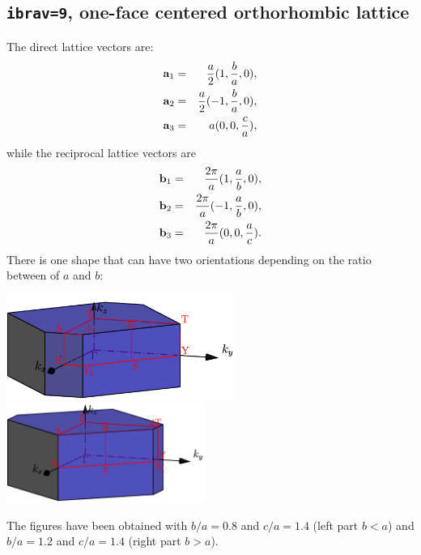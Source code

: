 \documentclass[12pt,a4paper]{article}
\begin{document}
\subsection{\texttt{ibrav=9}, one-face centered orthorhombic lattice}
The direct lattice vectors are:
\begin{eqnarray}
{\bf a}_1 &=& {a \over 2} (1, {b \over a}, 0), \nonumber \\
{\bf a}_2 &=& {a \over 2} (-1, {b \over a}, 0), \nonumber \\
{\bf a}_3 &=& a  (0, 0, {c \over a}), \nonumber
\nonumber
\end{eqnarray}
while the reciprocal lattice vectors are
\begin{eqnarray}
{\bf b}_1 &=& {2\pi \over a} (1, {a \over b}, 0), \nonumber \\
{\bf b}_2 &=& {2\pi \over a} (-1, {a \over b}, 0), \nonumber \\
{\bf b}_3 &=& {2\pi \over a} (0, 0, {a \over c}). \nonumber
\nonumber
\end{eqnarray}
There is one shape that can have two orientations depending on the
ratio between of $a$ and $b$:
\begin{center}
\includegraphics[width=7.5cm,angle=0]{images/ofco_2.png} \hspace{1cm}
\includegraphics[width=6.5cm,angle=0]{images/ofco_1.png}
\end{center}
The figures have been obtained with $b/a=0.8$ and $c/a=1.4$ (left part $b<a$) 
and $b/a=1.2$ and $c/a=1.4$ (right part $b>a$).
\end{document}
